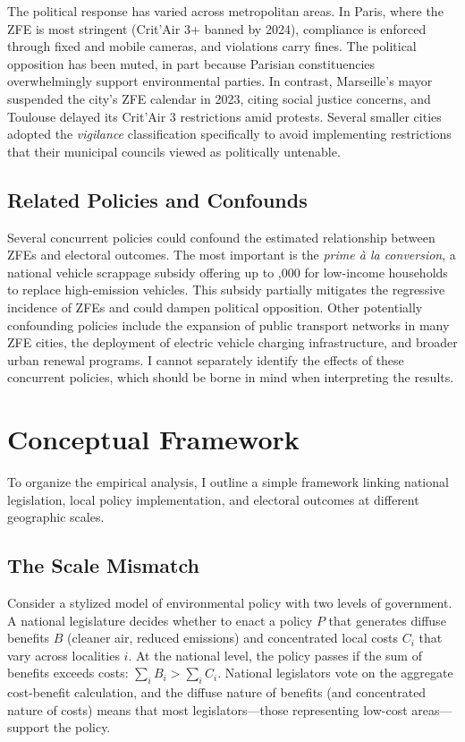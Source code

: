 \documentclass[12pt]{article}
\begin{document}
The political response has varied across metropolitan areas. In Paris, where the ZFE is most stringent (Crit'Air 3+ banned by 2024), compliance is enforced through fixed and mobile cameras, and violations carry  fines. The political opposition has been muted, in part because Parisian constituencies overwhelmingly support environmental parties. In contrast, Marseille's mayor suspended the city's ZFE calendar in 2023, citing social justice concerns, and Toulouse delayed its Crit'Air 3 restrictions amid protests. Several smaller cities adopted the \textit{vigilance} classification specifically to avoid implementing restrictions that their municipal councils viewed as politically untenable.

\subsection{Related Policies and Confounds}

Several concurrent policies could confound the estimated relationship between ZFEs and electoral outcomes. The most important is the \textit{prime \`a la conversion}, a national vehicle scrappage subsidy offering up to ,000 for low-income households to replace high-emission vehicles. This subsidy partially mitigates the regressive incidence of ZFEs and could dampen political opposition. Other potentially confounding policies include the expansion of public transport networks in many ZFE cities, the deployment of electric vehicle charging infrastructure, and broader urban renewal programs. I cannot separately identify the effects of these concurrent policies, which should be borne in mind when interpreting the results.


\section{Conceptual Framework}

To organize the empirical analysis, I outline a simple framework linking national legislation, local policy implementation, and electoral outcomes at different geographic scales.

\subsection{The Scale Mismatch}

Consider a stylized model of environmental policy with two levels of government. A national legislature decides whether to enact a policy $P$ that generates diffuse benefits $B$ (cleaner air, reduced emissions) and concentrated local costs $C_i$ that vary across localities $i$. At the national level, the policy passes if the sum of benefits exceeds costs: $\sum_i B_i > \sum_i C_i$. National legislators vote on the aggregate cost-benefit calculation, and the diffuse nature of benefits (and concentrated nature of costs) means that most legislators---those representing low-cost areas---support the policy.
\end{document}
